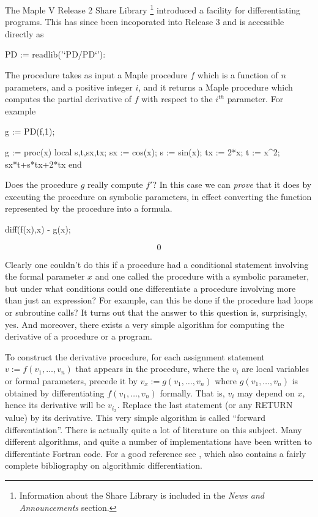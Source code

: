 \documentclass[11pt,dvips]{mtn}
\begin{document}
The Maple V Release 2 Share Library%
\footnote{Information about the Share Library
is included in the {\em News and Announcements} section.}
introduced a facility for differentiating programs.  This has
since been incoporated into Release 3 and is accessible directly
as
\begin{mapleinput}
PD := readlib('`PD/PD`'):
\end{mapleinput}
The  procedure takes as input a Maple procedure $f$ which
is a function of $n$ parameters, and a positive integer $i$, and it returns
a Maple procedure which computes the partial derivative of $f$ with
respect to the $i^{th}$ parameter.
For example

\begin{mapleinput}
g := PD(f,1);
\end{mapleinput}
\begin{maplelatex}
\end{maplelatex}
\begin{maplettyout}
g := proc(x)
     local s,t,sx,tx;
         sx := cos(x); s := sin(x); tx := 2*x; t := x^2; sx*t+s*tx+2*tx
     end

\end{maplettyout}
Does the procedure $g$ really compute $f'$?
In this case we can \emph{prove} that it does by executing the procedure
on symbolic parameters, in effect converting the function represented
by the procedure into a formula.

\begin{mapleinput}
diff(f(x),x) - g(x);
\end{mapleinput}
\begin{maplelatex}
\[
0
\]
\end{maplelatex}

Clearly one couldn't do this if a procedure had a conditional
statement involving the formal parameter $x$ and one called the procedure
with a symbolic parameter,  but
under what conditions could one differentiate a 
procedure involving more than just an expression?
For example, can this be done
if the procedure had loops or subroutine calls?
It turns out that the answer to this question is, surprisingly, yes.
And moreover, there exists a very simple algorithm for computing the
derivative of a procedure or a program.

To construct the derivative procedure,
for each assignment statement $v := f(v_1, \ldots , v_n)$ that appears
in the procedure, where the $v_i$ are local variables or formal parameters,
precede it by $v_x := g(v_1, \ldots , v_n)$ where
$g(v_1, \ldots , v_n)$ is obtained by differentiating $f(v_1, \ldots , v_n)$
formally.  That is, $v_i$ may depend on $x$, hence its derivative
will be $v_{i_x}$.
Replace the last statement (or any RETURN value) by its derivative.
This very simple algorithm is called ``forward differentiation''.
There is actually quite a lot of literature on this subject. Many different
algorithms, and quite a number of implementations have been
written to differentiate Fortran code.
For a good reference see {\cite {PROCEEDINGS}}, which also contains a
fairly complete bibliography on algorithmic differentiation.
\end{document}
